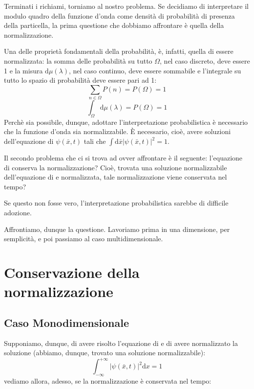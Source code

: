Terminati i richiami, torniamo al nostro problema.
Se decidiamo di interpretare il modulo quadro della funzione d'onda come densità di probabilità di presenza della particella, la prima questione che dobbiamo affrontare è quella della normalizzazione.

Una delle proprietà fondamentali della probabilità, è, infatti, quella di essere normalizzata: la somma delle probabilità su tutto $\Omega$, nel caso discreto, deve essere 1 e la misura $\textrm{d}\mu(\lambda)$, nel caso continuo, deve essere sommabile e l'integrale su tutto lo spazio di probabilità deve essere pari ad 1:
\begin{equation}
\sum_{n\in \Omega}P(n)=P(\Omega)=1
\end{equation}
\begin{equation}
\int_{\Omega}^{}{\textrm{d}\mu\left(\lambda\right)}=P(\Omega)=1
\end{equation}
Perchè sia possibile, dunque, adottare l'interpretazione probabilistica è necessario che la funzione d'onda sia normalizzabile. \`E necessario, cioè, avere soluzioni dell'equazione di \sch $\psi(\bar x,t)$ tali che $\int{\textrm{d}\bar x |\psi(\bar x,t)|^2}=1$.

Il secondo problema che ci si trova ad ovver affrontare è il seguente: l'equazione di \sch conserva la normalizzazione? Cioè, trovata una soluzione normalizzabile dell'equazione di \sch e normalizzata, tale normalizzazione viene conservata nel tempo?

Se questo non fosse vero, l'interpretazione probabilistica sarebbe di difficile adozione.

Affrontiamo, dunque la questione. Lavoriamo prima in una dimensione, per semplicità, e poi passiamo al caso multidimensionale.

\section{Conservazione della normalizzazione} %
\subsection{Caso Monodimensionale} %
Supponiamo, dunque, di avere risolto l'equazione di \sch e di avere normalizzato la soluzione (abbiamo, dunque, trovato una soluzione normalizzabile):
\begin{equation} \label{norm}
\int_{-\infty}^{+\infty}{|\psi \left(\bar x,t\right)|^2\textrm{d}x}=1
\end{equation}
vediamo allora, adesso, se la normalizzazione è conservata nel tempo:

